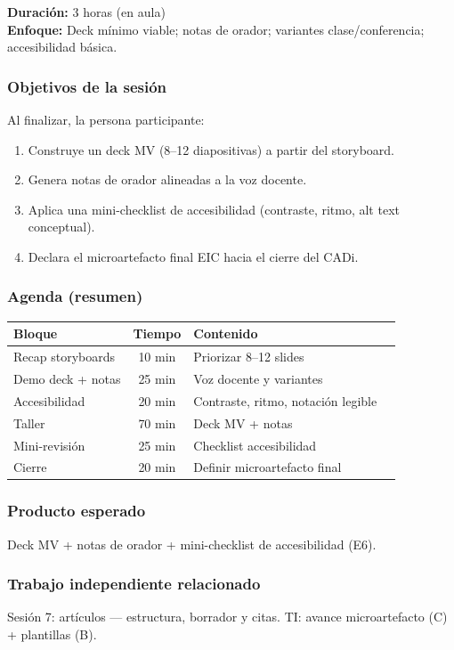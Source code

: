 \textbf{Duración:} 3 horas (en aula)\\
\textbf{Enfoque:} Deck mínimo viable; notas de orador; variantes clase/conferencia; accesibilidad básica.

\subsubsection*{Objetivos de la sesión}
Al finalizar, la persona participante:
\begin{enumerate}
\item Construye un deck MV (8--12 diapositivas) a partir del storyboard.
\item Genera notas de orador alineadas a la voz docente.
\item Aplica una mini-checklist de accesibilidad (contraste, ritmo, alt text conceptual).
\item Declara el microartefacto final EIC hacia el cierre del CADi.
\end{enumerate}

\subsubsection*{Agenda (resumen)}
\begin{tabularx}{\textwidth}{@{}lclX@{}}
\toprule
Bloque & Tiempo & Contenido \\
\midrule
Recap storyboards & 10 min & Priorizar 8--12 slides \\
Demo deck + notas & 25 min & Voz docente y variantes \\
Accesibilidad & 20 min & Contraste, ritmo, notación legible \\
Taller & 70 min & Deck MV + notas \\
Mini-revisión & 25 min & Checklist accesibilidad \\
Cierre & 20 min & Definir microartefacto final \\
\bottomrule
\end{tabularx}

\subsubsection*{Producto esperado}
Deck MV + notas de orador + mini-checklist de accesibilidad (E6).

\subsubsection*{Trabajo independiente relacionado}
Sesión 7: artículos --- estructura, borrador y citas. TI: avance microartefacto (C) + plantillas (B).
